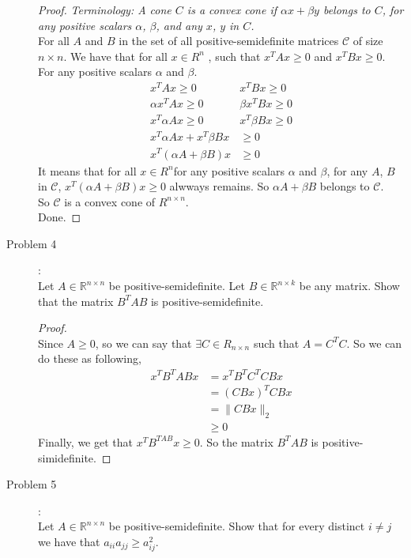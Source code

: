 \documentclass[a4paper]{article}
\begin{document}
\begin{description}
  \begin{proof}
    \textit{Terminology: A cone $C$ is a convex cone if $\alpha x + \beta y$ belongs to $C$, for any positive scalars $\alpha$, $\beta$, and any $x$, $y$ in $C$.}\\
    For all $A$ and $B$ in the set of all positive-semidefinite matrices $\mathcal{C}$ of size $n\times n$. We have that for all $x\in R^{n}$ , such that $x^{T}Ax\ge 0$ and $x^{T}Bx\ge 0$.\\
    For any positive scalars $\alpha$ and $\beta$.
    \begin{align*}
      x^{T}Ax\ge 0 \quad & x^{T}Bx\ge 0\\
      \alpha x^{T}Ax\ge 0 \quad & \beta x^{T}Bx\ge 0\\
      x^{T}\alpha A x\ge 0 \quad & x^{T}\beta Bx\ge 0\\
      x^{T}\alpha Ax+x^{T}\beta Bx &\ge 0\\
      x^{T}(\alpha A+\beta B)x&\ge 0
    \end{align*}
    It means that for all $x\in R^{n}$for any positive scalars $\alpha$ and $\beta$, for any $A$, $B$ in $\mathcal{C}$, $x^{T}(\alpha A+\beta B)x\ge 0 $ alwways remains. So $\alpha A +\beta B$ belongs to $\mathcal{C}$.\\
    So $\mathcal{C}$ is a convex cone of $R^{n\times n}$.\\
    Done.
  \end{proof}

  \item[Problem 4]:\\
  Let $A\in \mathbb{R}^{n\times n}$ be positive-semidefinite. Let $B\in \mathbb{R}^{n\times k}$ be any matrix. Show that the matrix $B^{T}AB$ is positive-semidefinite.

  \begin{proof}\ \\
    Since $A\ge 0$, so we can say that $\exists C \in R_{n\times n}$ such that $A=C^{T}C$. So we can do these as following,
    \begin{align*}
      x^{T}B^{T}ABx&=x^{T}B^{T}C^{T}CBx\\
      &=(CBx)^{T}CBx\\
      &=\|CBx\|_{2} \\
      &\ge 0
    \end{align*}
    Finally, we get that $x^{T}B^{TAB}x\ge 0$. So the matrix $B^{T}AB$ is positive-simidefinite.
  \end{proof}

  \item[Problem 5]:\\
   Let $A\in \mathbb{R}^{n\times n}$ be positive-semidefinite. Show that for every distinct $i\ne j$ we have that $a_{ii}a_{jj}\ge a_{ij}^{2}$.


\end{description}
\end{document}
